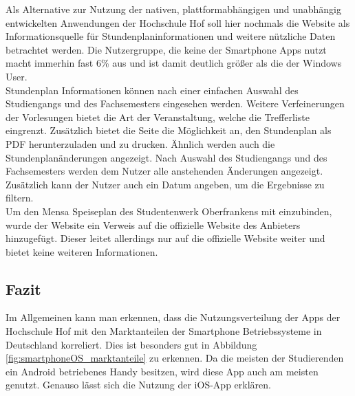 Als Alternative zur Nutzung der nativen, plattformabhängigen und unabhängig entwickelten Anwendungen der Hochschule Hof soll hier nochmals die Website als Informationsquelle für Stundenplaninformationen und weitere nützliche Daten betrachtet werden. Die Nutzergruppe, die keine der Smartphone \acp{App} nutzt macht immerhin fast 6\% aus und ist damit deutlich größer als die der Windows User.
\\
\linebreak
Stundenplan Informationen können nach einer einfachen Auswahl des Studiengangs und des Fachsemesters eingesehen werden. Weitere Verfeinerungen der Vorlesungen bietet die Art der Veranstaltung, welche die Trefferliste eingrenzt. Zusätzlich bietet die Seite die Möglichkeit an, den Stundenplan als \ac{PDF} herunterzuladen und zu drucken. Ähnlich werden auch die Stundenplanänderungen angezeigt. Nach Auswahl des Studiengangs und des Fachsemesters werden dem Nutzer alle anstehenden Änderungen angezeigt. Zusätzlich kann der Nutzer auch ein Datum angeben, um die Ergebnisse zu filtern.
\\
\linebreak
Um den Mensa Speiseplan des Studentenwerk Oberfrankens mit einzubinden, wurde der Website ein Verweis auf die offizielle Website des Anbieters hinzugefügt. Dieser leitet allerdings nur auf die offizielle Website weiter und bietet keine weiteren Informationen.

\subsection{Fazit}

Im Allgemeinen kann man erkennen, dass die Nutzungsverteilung der \acp{App} der Hochschule Hof mit den Marktanteilen der Smartphone Betriebssysteme in Deutschland korreliert. Dies ist besonders gut in Abbildung \ref{fig:smartphoneOS_marktanteile} zu erkennen\autocite[][]{mobileosstatista}. Da die meisten der Studierenden ein Android betriebenes Handy besitzen, wird diese \ac{App} auch am meisten genutzt. Genauso lässt sich die Nutzung der \ac{iOS}-\ac{App} erklären. 

